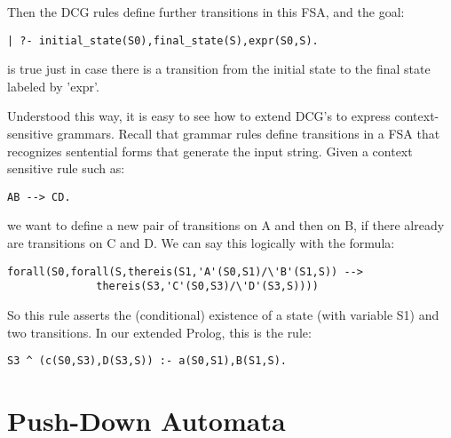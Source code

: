 Then the DCG rules define further transitions in this FSA, and the
goal:
\begin{verbatim}
| ?- initial_state(S0),final_state(S),expr(S0,S).
\end{verbatim}
is true just in case there is a transition from the initial state to
the final state labeled by 'expr'.

Understood this way, it is easy to see how to extend DCG's to express
context-sensitive grammars.  Recall that grammar rules define
transitions in a FSA that recognizes sentential forms that generate
the input string.  Given a context sensitive rule such as:
\begin{verbatim}
AB --> CD.
\end{verbatim}
we want to define a new pair of transitions on A and then on B, if
there already are transitions on C and D.  We can say this logically
with the formula:
\begin{verbatim}
forall(S0,forall(S,thereis(S1,'A'(S0,S1)/\'B'(S1,S)) --> 
              thereis(S3,'C'(S0,S3)/\'D'(S3,S))))
\end{verbatim}
So this rule asserts the (conditional) existence of a state (with
variable S1) and two transitions.  In our extended Prolog, this is the
rule:
\begin{verbatim}
S3 ^ (c(S0,S3),D(S3,S)) :- a(S0,S1),B(S1,S).
\end{verbatim}


\section{Push-Down Automata}
